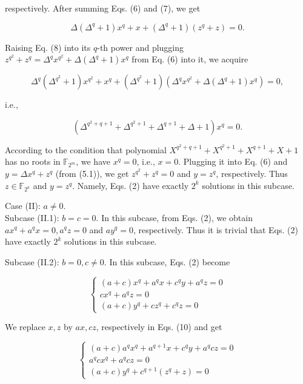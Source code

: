 \documentclass[10pt]{article}
\begin{document}
respectively. After summing Eqs. (6) and (7), we get


\begin{equation*}
\Delta\left(\Delta^{q}+1\right) x^{q}+x+\left(\Delta^{q}+1\right)\left(z^{q}+z\right)=0 . \tag{8}
\end{equation*}


Raising Eq. (8) into its $q$-th power and plugging $z^{q^{2}}+z^{q}=\Delta^{q} x^{q^{2}}+\Delta\left(\Delta^{q}+1\right) x^{q}$ from Eq. (6) into it, we acquire

$$
\Delta^{q}\left(\Delta^{q^{2}}+1\right) x^{q^{2}}+x^{q}+\left(\Delta^{q^{2}}+1\right)\left(\Delta^{q} x^{q^{2}}+\Delta\left(\Delta^{q}+1\right) x^{q}\right)=0,
$$

i.e.,


\begin{equation*}
\left(\Delta^{q^{2}+q+1}+\Delta^{q^{2}+1}+\Delta^{q+1}+\Delta+1\right) x^{q}=0 . \tag{9}
\end{equation*}


According to the condition that polynomial $X^{q^{2}+q+1}+X^{q^{2}+1}+X^{q+1}+X+1$ has no roots in $\mathbb{F}_{2^{m}}$, we have $x^{q}=0$, i.e., $x=0$. Plugging it into Eq. (6) and $y=\Delta x^{q}+z^{q}$ (from (5.1)), we get $z^{q^{2}}+z^{q}=0$ and $y=z^{q}$, respectively. Thus $z \in \mathbb{F}_{2^{k}}$ and $y=z^{q}$. Namely, Eqs. (2) have exactly $2^{k}$ solutions in this subcase.

Case (II): $a \neq 0$.\\
Subcase (II.1): $b=c=0$. In this subcase, from Eqs. (2), we obtain $a x^{q}+a^{q} x=0, a^{q} z=0$ and $a y^{q}=0$, respectively. Thus it is trivial that Eqs. (2) have exactly $2^{k}$ solutions in this subcase.

Subcase (II.2): $b=0, c \neq 0$. In this subcase, Eqs. (2) become

\[
\left\{\begin{array}{l}
(a+c) x^{q}+a^{q} x+c^{q} y+a^{q} z=0  \tag{10.1}\\
c x^{q}+a^{q} z=0 \\
(a+c) y^{q}+c z^{q}+c^{q} z=0
\end{array}\right.
\]

We replace $x, z$ by $a x, c z$, respectively in Eqs. (10) and get

\[
\left\{\begin{array}{l}
(a+c) a^{q} x^{q}+a^{q+1} x+c^{q} y+a^{q} c z=0  \tag{11.1}\\
a^{q} c x^{q}+a^{q} c z=0 \\
(a+c) y^{q}+c^{q+1}\left(z^{q}+z\right)=0
\end{array}\right.
\]
\end{document}
